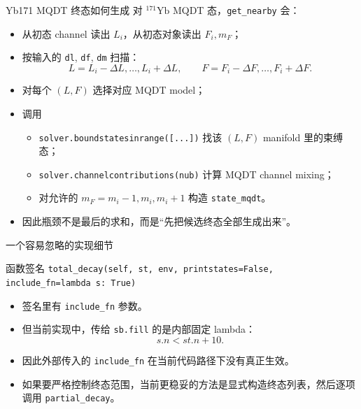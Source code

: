 \documentclass[aspectratio=169,11pt]{ctexbeamer}
\begin{document}
\begin{frame}{Yb171 MQDT 终态如何生成}
  对 \({}^{171}\mathrm{Yb}\) MQDT 态，\texttt{get\_nearby} 会：
  \begin{itemize}
    \item 从初态 channel 读出 \(L_i\)，从初态对象读出 \(F_i,m_F\)；
    \item 按输入的 \texttt{dl}, \texttt{df}, \texttt{dm} 扫描：
      \[
        L=L_i-\Delta L,\ldots,L_i+\Delta L,
        \qquad
        F=F_i-\Delta F,\ldots,F_i+\Delta F.
      \]
    \item 对每个 \((L,F)\) 选择对应 MQDT model；
    \item 调用
      \begin{itemize}
        \item \texttt{solver.boundstatesinrange([...])} 找该 \((L,F)\) manifold 里的束缚态；
        \item \texttt{solver.channelcontributions(nub)} 计算 MQDT channel mixing；
        \item 对允许的 \(m_F=m_i-1,m_i,m_i+1\) 构造 \texttt{state\_mqdt}。
      \end{itemize}
    \item 因此瓶颈不是最后的求和，而是“先把候选终态全部生成出来”。
  \end{itemize}
\end{frame}

\begin{frame}{一个容易忽略的实现细节}
  \begin{block}{函数签名}
    \texttt{total\_decay(self, st, env, printstates=False, include\_fn=lambda s: True)}
  \end{block}

  \begin{itemize}
    \item 签名里有 \texttt{include\_fn} 参数。
    \item 但当前实现中，传给 \texttt{sb.fill} 的是内部固定 lambda：
      \[
        s.n < st.n + 10.
      \]
    \item 因此外部传入的 \texttt{include\_fn} 在当前代码路径下没有真正生效。
    \item 如果要严格控制终态范围，当前更稳妥的方法是显式构造终态列表，然后逐项调用 \texttt{partial\_decay}。
  \end{itemize}
\end{frame}
\end{document}
